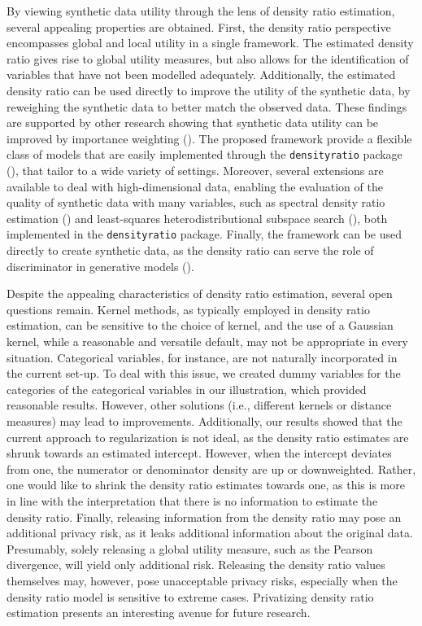 \documentclass[
]{article}
\begin{document}
By viewing synthetic data utility through the lens of density ratio
estimation, several appealing properties are obtained. First, the
density ratio perspective encompasses global and local utility in a
single framework. The estimated density ratio gives rise to global
utility measures, but also allows for the identification of variables
that have not been modelled adequately. Additionally, the estimated
density ratio can be used directly to improve the utility of the
synthetic data, by reweighing the synthetic data to better match the
observed data. These findings are supported by other research showing
that synthetic data utility can be improved by importance weighting
(). The
proposed framework provide a flexible class of models that are easily
implemented through the \texttt{densityratio} package
(), that tailor to a wide
variety of settings. Moreover, several extensions are available to deal
with high-dimensional data, enabling the evaluation of the quality of
synthetic data with many variables, such as spectral density ratio
estimation () and least-squares heterodistributional subspace search
(), both
implemented in the \texttt{densityratio} package. Finally, the framework
can be used directly to create synthetic data, as the density ratio can
serve the role of discriminator in generative models
().

Despite the appealing characteristics of density ratio estimation,
several open questions remain. Kernel methods, as typically employed in
density ratio estimation, can be sensitive to the choice of kernel, and
the use of a Gaussian kernel, while a reasonable and versatile default,
may not be appropriate in every situation. Categorical variables, for
instance, are not naturally incorporated in the current set-up. To deal
with this issue, we created dummy variables for the categories of the
categorical variables in our illustration, which provided reasonable
results. However, other solutions (i.e., different kernels or distance
measures) may lead to improvements. Additionally, our results showed
that the current approach to regularization is not ideal, as the density
ratio estimates are shrunk towards an estimated intercept. However, when
the intercept deviates from one, the numerator or denominator density
are up or downweighted. Rather, one would like to shrink the density
ratio estimates towards one, as this is more in line with the
interpretation that there is no information to estimate the density
ratio. Finally, releasing information from the density ratio may pose an
additional privacy risk, as it leaks additional information about the
original data. Presumably, solely releasing a global utility measure,
such as the Pearson divergence, will yield only additional risk.
Releasing the density ratio values themselves may, however, pose
unacceptable privacy risks, especially when the density ratio model is
sensitive to extreme cases. Privatizing density ratio estimation
presents an interesting avenue for future research.
\end{document}
